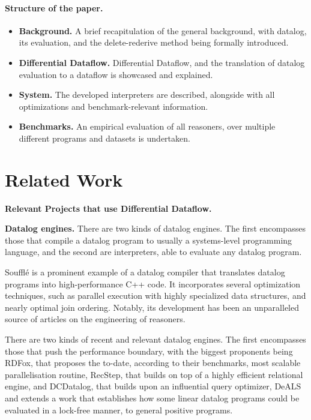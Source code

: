 \documentclass[sigconf,screen,review,natbib]{acmart}
\theoremstyle{definition}
\begin{document}
\paragraph{Structure of the paper.}
\begin{itemize}
	\item{\textbf{Background.}} A brief recapitulation of the general background, with datalog, its evaluation,
	and the delete-rederive method being formally introduced.
	\item{\textbf{Differential Dataflow.}} Differential Dataflow, and the translation of datalog evaluation to
	a dataflow is showcased and explained.
	\item{\textbf{System.}} The developed interpreters are described, alongside with all optimizations and
	benchmark-relevant information.
	\item{\textbf{Benchmarks.}} An empirical evaluation of all reasoners, over multiple different programs and
	datasets is undertaken.
\end{itemize}

\section{Related Work}

\textbf{Relevant Projects that use Differential Dataflow.}

\textbf{Datalog engines.} There are two kinds of datalog engines. The first encompasses those that compile
a datalog program to usually a systems-level programming language, and the second are interpreters, able to
evaluate any datalog program.

Soufflé\cite{souffle} is a prominent example of a datalog compiler that translates datalog programs into high-performance C++ code. It incorporates several optimization techniques, such as parallel execution with highly specialized data structures\cite{souffle_btree}, and nearly optimal join ordering\cite{souffle_join}. Notably, its development has been an unparalleled source of articles on the engineering of reasoners.

There are two kinds of recent and relevant datalog engines. The first encompasses
those that push the performance boundary, with the biggest proponents being RDFox\cite{rdfox}, that
proposes the to-date, according to their benchmarks, most scalable parallelisation routine, RecStep\cite{recstep},
that builds on top of a highly efficient relational engine, and DCDatalog\cite{dcdatalog}, that builds upon
an influential query optimizer, DeALS\cite{deals} and extends a work that establishes how some linear
datalog programs could be evaluated in a lock-free manner, to general positive programs.
\end{document}

